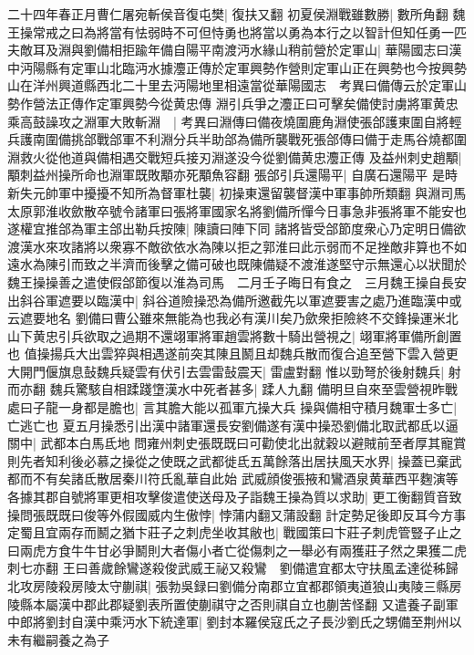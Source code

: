 二十四年春正月曹仁屠宛斬侯音復屯樊|{
	復扶又翻}
初夏侯淵戰雖數勝|{
	數所角翻}
魏王操常戒之曰為將當有怯弱時不可但恃勇也將當以勇為本行之以智計但知任勇一匹夫敵耳及淵與劉備相拒踰年備自陽平南渡沔水緣山稍前營於定軍山|{
	華陽國志曰漢中沔陽縣有定軍山北臨沔水據灋正傳於定軍興勢作營則定軍山正在興勢也今按興勢山在洋州興道縣西北二十里去沔陽地里相遠當從華陽國志　考異曰備傳云於定軍山勢作營法正傳作定軍興勢今從黄忠傳}
淵引兵爭之灋正曰可擊矣備使討虜將軍黄忠乘高鼓譟攻之淵軍大敗斬淵　|{
	考異曰淵傳曰備夜燒圍鹿角淵使張郃護東圍自將輕兵護南圍備挑郃戰郃軍不利淵分兵半助郃為備所襲戰死張郃傳曰備于走馬谷燒都圍淵救火從他道與備相遇交戰短兵接刃淵遂没今從劉備黄忠灋正傳}
及益州刺史趙顒|{
	顒刺益州操所命也淵軍既敗顒亦死顒魚容翻}
張郃引兵還陽平|{
	自廣石還陽平}
是時新失元帥軍中擾擾不知所為督軍杜襲|{
	初操東還留襲督漢中軍事帥所類翻}
與淵司馬太原郭淮收歛散卒號令諸軍曰張將軍國家名將劉備所憚今日事急非張將軍不能安也遂權宜推郃為軍主郃出勒兵按陳|{
	陳讀曰陣下同}
諸將皆受郃節度衆心乃定明日備欲渡漢水來攻諸將以衆寡不敵欲依水為陳以拒之郭淮曰此示弱而不足挫敵非算也不如遠水為陳引而致之半濟而後擊之備可破也既陳備疑不渡淮遂堅守示無還心以狀聞於魏王操操善之遣使假郃節復以淮為司馬　二月壬子晦日有食之　三月魏王操自長安出斜谷軍遮要以臨漢中|{
	斜谷道險操恐為備所邀截先以軍遮要害之處乃進臨漢中或云遮要地名}
劉備曰曹公雖來無能為也我必有漢川矣乃歛衆拒險終不交鋒操運米北山下黄忠引兵欲取之過期不還翊軍將軍趙雲將數十騎出營視之|{
	翊軍將軍備所創置也}
值操揚兵大出雲猝與相遇遂前突其陳且鬭且却魏兵散而復合追至營下雲入營更大開門偃旗息鼔魏兵疑雲有伏引去雲雷鼔震天|{
	雷盧對翻}
惟以勁弩於後射魏兵|{
	射而亦翻}
魏兵驚駭自相蹂踐墯漢水中死者甚多|{
	蹂人九翻}
備明旦自來至雲營視昨戰處曰子龍一身都是膽也|{
	言其膽大能以孤軍亢操大兵}
操與備相守積月魏軍士多亡|{
	亡逃亡也}
夏五月操悉引出漢中諸軍還長安劉備遂有漢中操恐劉備北取武都氐以逼關中|{
	武都本白馬氐地}
問雍州刺史張既既曰可勸使北出就穀以避賊前至者厚其寵賞則先者知利後必慕之操從之使既之武都徙氐五萬餘落出居扶風天水界|{
	操蓋已棄武都而不有矣諸氐散居秦川符氏亂華自此始}
武威顔俊張掖和鸞酒泉黄華西平麴演等各據其郡自號將軍更相攻擊俊遣使送母及子詣魏王操為質以求助|{
	更工衡翻質音致}
操問張既既曰俊等外假國威内生傲悖|{
	悖蒲内翻又蒲設翻}
計定勢足後即反耳今方事定蜀且宜兩存而鬭之猶卞莊子之刺虎坐收其敝也|{
	戰國策曰卞莊子刺虎管豎子止之曰兩虎方食牛牛甘必爭鬭則大者傷小者亡從傷刺之一舉必有兩獲莊子然之果獲二虎刺七亦翻}
王曰善歲餘鸞遂殺俊武威王祕又殺鸞　劉備遣宜都太守扶風孟達從秭歸北攻房陵殺房陵太守蒯祺|{
	張勃吳録曰劉備分南郡立宜都郡領夷道狼山夷陵三縣房陵縣本屬漢中郡此郡疑劉表所置使蒯祺守之否則祺自立也蒯苦怪翻}
又遣養子副軍中郎將劉封自漢中乘沔水下統達軍|{
	劉封本羅侯寇氏之子長沙劉氏之甥備至荆州以未有繼嗣養之為子}
